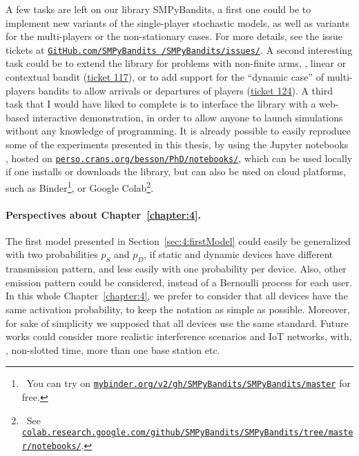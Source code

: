 A few tasks are left on our library SMPyBandits, a first one could be to implement new variants of the single-player stochastic models, as well as variants for the multi-players or the non-stationary cases.
For more details, see the issue tickets at \href{https://github.com/SMPyBandits/SMPyBandits/issues/}{\texttt{GitHub.com/SMPyBandits /SMPyBandits/issues/}}.
%
A second interesting task could be to extend the library for problems with non-finite arms, \eg, linear or contextual bandit (\href{https://github.com/SMPyBandits/SMPyBandits/issues/117}{ticket 117}),
or to add support for the ``dynamic case'' of multi-players bandits to allow arrivals or departures of players (\href{https://github.com/SMPyBandits/SMPyBandits/issues/124}{ticket 124}).
%
A third task that I would have liked to complete is to interface the library with a web-based interactive demonstration, in order to allow anyone to launch simulations without any knowledge of programming.
It is already possible to easily reproduce some of the experiments presented in this thesis, by using the Jupyter notebooks \cite{jupyter}, hosted on \href{https://perso.crans.org/besson/PhD/notebooks/}{\texttt{perso.crans.org/besson/PhD/notebooks/}}, which can be used locally if one installs or downloads the library, but can also be used on cloud platforms, such as
Binder\footnote{~You can try on \href{https://mybinder.org/v2/gh/SMPyBandits/SMPyBandits/master}{\texttt{mybinder.org/v2/gh/SMPyBandits/SMPyBandits/master}} for free.},
or Google Colab\footnote{~See \href{https://colab.research.google.com/github/SMPyBandits/SMPyBandits/tree/master/notebooks/}{\texttt{colab.research.google.com/github/SMPyBandits/SMPyBandits/tree/master/notebooks/}}.}.



\paragraph{Perspectives about \textbf{Chapter~\ref{chapter:4}}.}




The first model presented in Section~\ref{sec:4:firstModel} could easily be generalized with two probabilities $p_S$ and $p_D$, if static and dynamic devices have different transmission pattern, and less easily with one probability per device. Also, other emission pattern could be considered, instead of a Bernoulli process for each user.
In this whole Chapter~\ref{chapter:4}, we prefer to consider that all devices have the same activation probability, to keep the notation as simple as possible.
%
Moreover, for sake of simplicity we supposed that all devices use the same standard.
Future works could consider more realistic interference scenarios and IoT networks, with, \eg, non-slotted time, more than one base station etc.

